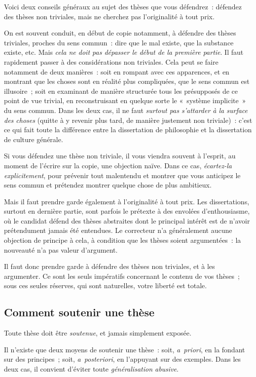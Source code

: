 \documentclass[a4paper]{article}
\begin{document}
Voici deux conseils généraux au sujet des thèses que vous défendrez :
défendez des thèses non triviales, mais ne cherchez pas l'originalité à
tout prix.

On est souvent conduit, en début de copie notamment, à défendre des
thèses triviales, proches du sens commun : dire que le mal existe, que
la substance existe, etc. Mais \emph{cela ne doit pas dépasser le début de la première partie}. Il faut rapidement passer à des considérations non
triviales. Cela peut se faire notamment de deux manières : soit en
rompant avec ces apparences, et en montrant que les choses sont en
réalité plus compliquées, que le sens commun est illusoire ; soit en
examinant de manière structurée tous les présupposés de ce point de vue
trivial, en reconstruisant en quelque sorte le « système implicite » du
sens commun. Dans les deux cas, il ne faut \emph{surtout pas s'attarder à la surface des choses} (quitte à y revenir plus tard, de manière justement
non triviale) : c'est ce qui fait toute la différence entre la
dissertation de philosophie et la dissertation de culture générale.

Si vous défendez une thèse non triviale, il vous viendra souvent à
l'esprit, au moment de l'écrire sur la copie, une objection naïve. Dans
ce cas, \emph{écartez-la explicitement}, pour prévenir tout malentendu et
montrer que vous anticipez le sens commun et prétendez montrer quelque
chose de plus ambitieux.

Mais il faut prendre garde également à l'originalité à tout prix. Les
dissertations, surtout en dernière partie, sont parfois le prétexte à
des envolées d'enthousiasme, où le candidat défend des thèses abstraites
dont le principal intérêt est de n'avoir prétendument jamais été
entendues. Le correcteur n'a généralement aucune objection de principe à
cela, à condition que les thèses soient argumentées : la nouveauté n'a
pas valeur d'argument.

Il faut donc prendre garde à défendre des thèses non triviales, et à les
argumenter. Ce sont les seuls impératifs concernant le contenu de vos
thèses ; sous ces seules réserves, qui sont naturelles, votre liberté
est totale.
\subsection{Comment soutenir une thèse}
\label{sec-3-4}


Toute thèse doit être \emph{soutenue}, et jamais simplement exposée.

Il n'existe que deux moyens de soutenir une thèse : soit, \emph{a priori}, en
la fondant sur des principes ; soit, \emph{a posteriori}, en l'appuyant sur
des exemples. Dans les deux cas, il convient d'éviter toute
\emph{généralisation abusive}.
\end{document}
